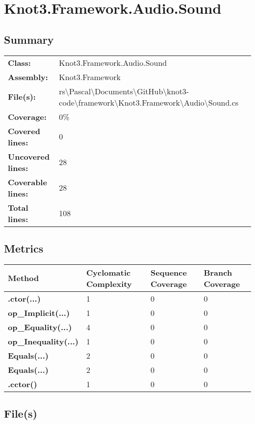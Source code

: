 \documentclass[a4paper,10pt]{article}
\begin{document}
\section{Knot3.Framework.Audio.Sound}
\subsection{Summary}
\begin{longtable}[l]{ll}
\textbf{Class:} & Knot3.Framework.Audio.Sound\\
\textbf{Assembly:} & Knot3.Framework\\
\textbf{File(s):} & \begin{minipage}[t]{12cm}{rs\textbackslash Pascal\textbackslash Documents\textbackslash GitHub\textbackslash knot3-code\textbackslash framework\textbackslash Knot3.Framework\textbackslash Audio\textbackslash Sound.cs}\end{minipage} \\
\textbf{Coverage:} & 0\%\\
\textbf{Covered lines:} & 0\\
\textbf{Uncovered lines:} & 28\\
\textbf{Coverable lines:} & 28\\
\textbf{Total lines:} & 108\\
\end{longtable}
\subsection{Metrics}
\begin{longtable}[l]{|l|l|l|l|}
\hline
\textbf{Method} & \textbf{Cyclomatic Complexity} & \textbf{Sequence Coverage} & \textbf{Branch Coverage}\\
\hline
\textbf{.ctor(...)} & 1 & 0 & 0\\
\hline
\textbf{op\_Implicit(...)} & 1 & 0 & 0\\
\hline
\textbf{op\_Equality(...)} & 4 & 0 & 0\\
\hline
\textbf{op\_Inequality(...)} & 1 & 0 & 0\\
\hline
\textbf{Equals(...)} & 2 & 0 & 0\\
\hline
\textbf{Equals(...)} & 2 & 0 & 0\\
\hline
\textbf{.cctor()} & 1 & 0 & 0\\
\hline
\end{longtable}
\subsection{File(s)}
\end{document}
